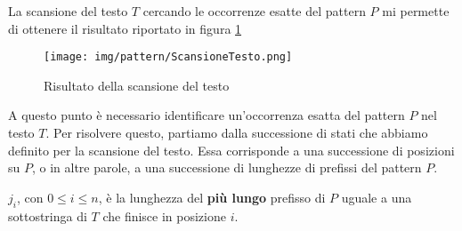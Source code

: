\begin{esempio}
    La scansione del testo $T$ cercando le occorrenze esatte del pattern $P$ mi
    permette di ottenere il risultato riportato in figura \ref{fig:scansione}
    \begin{figure}[!ht]
        \centering
        \texttt{[image: img/pattern/ScansioneTesto.png]}
        \caption{Risultato della scansione del testo}
        \label{fig:scansione}
    \end{figure}
\end{esempio}
A questo punto è necessario identificare un'occorrenza esatta del pattern $P$
nel testo $T$. Per risolvere questo, partiamo dalla successione di stati che
abbiamo definito per la scansione del testo. Essa corrisponde a una successione
di posizioni su $P$, o in altre parole, a una successione di lunghezze di
prefissi del pattern $P$.
\begin{teorema}
    $j_i$, con $0 \leq i \leq n$, è la lunghezza del \textbf{più lungo} prefisso
    di $P$ uguale a una sottostringa di $T$ che finisce in posizione $i$.
\end{teorema}
